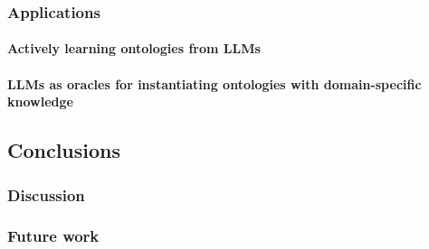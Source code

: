 \documentclass[12pt,a4paper,openright,twoside]{book}
\begin{document}
\section{Applications}\label{sec:applications}

\subsection{Actively learning ontologies from \acp{LLM}}\label{subsec:exact-learning-with-ac{llm}}

\subsection{\Aclp{LLM} as oracles for instantiating ontologies with domain-specific knowledge}\label{subsec:llm-as-oracles-for-instantiating-ontologies-with-domain-specific-knowledge}


\chapter{Conclusions}\label{ch:conclusions}

\section{Discussion}\label{sec:discussion}

\section{Future work}\label{sec:future-work}


\backmatter

\part*{}

\nocite{*} %


\end{document}
